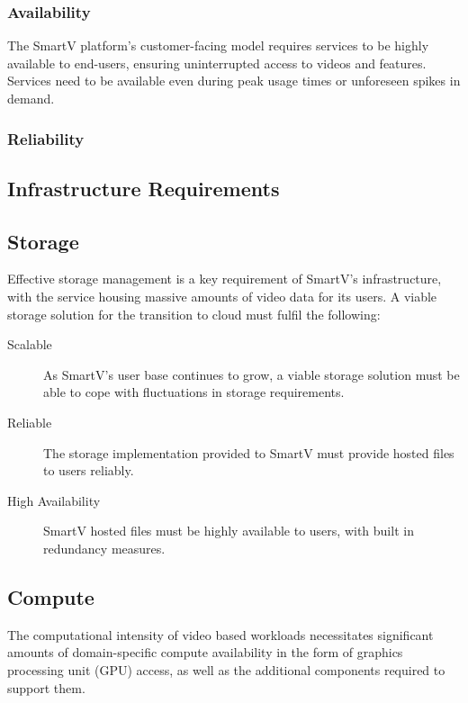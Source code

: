 \documentclass[]{article}
\begin{document}
\subsubsection{Availability}

The SmartV platform's customer-facing model requires services to be highly available to end-users, ensuring uninterrupted access to videos and features. Services need to be available even during peak usage times or unforeseen spikes in demand.

\subsubsection{Reliability}

\subsection{Infrastructure Requirements}

\subsection{Storage}

Effective storage management is a key requirement of SmartV's infrastructure, with the service housing massive amounts of video data for its users. A viable storage solution for the transition to cloud must fulfil the following:

\begin{description}
    \item[Scalable] As SmartV's user base continues to grow, a viable storage solution must be able to cope with fluctuations in storage requirements.
    \item[Reliable] The storage implementation provided to SmartV must provide hosted files to users reliably.
    \item[High Availability] SmartV hosted files must be highly available to users, with built in redundancy measures.
\end{description}



\subsection{Compute}

The computational intensity of video based workloads necessitates significant amounts of domain-specific compute availability in the form of graphics processing unit (GPU) access, as well as the additional components required to support them. 
\end{document}
